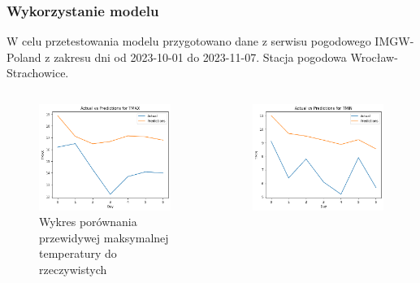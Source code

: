 \documentclass[usepdftitle=false,24pt]{beamer}
\begin{document}
\begin{frame}
    \frametitle{Wykorzystanie modelu}
    W celu przetestowania modelu przygotowano dane z serwisu pogodowego IMGW-Poland \cite{IMGW-Poland} z zakresu dni od 2023-10-01 do 2023-11-07. Stacja pogodowa Wrocław-Strachowice.

    \begin{columns}[T]
        \begin{column}{.5\textwidth}
            \begin{figure}
                \includegraphics[width=\textwidth]{images/tmax.png}
                \caption{Wykres porównania przewidywej maksymalnej temperatury do rzeczywistych}
                \label{rys-tmax}
            \end{figure}
        \end{column}
        \begin{column}{.5\textwidth}
            \begin{figure}
                \includegraphics[width=\textwidth]{images/tmin.png}

\end{figure}
\end{column}
\end{columns}
\end{frame}
\end{document}
